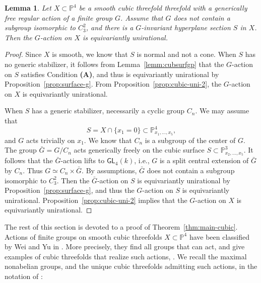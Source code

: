 \documentclass[12pt,reqno]{amsart}
\theoremstyle{plain}
\newtheorem{lemm}[prop]{Lemma}
\theoremstyle{remark}
\theoremstyle{definition}
\numberwithin{equation}{section}
\def\bP{{\mathbb P}}
\def\GL{\mathsf{GL}}
\begin{document}
 \begin{lemm}\label{lemm:invariantunicub}
Let $X\subset \bP^4$ be a smooth cubic threefold threefold with a generically free regular action of a finite group $G$. Assume that $G$ does not contain a subgroup isomorphic to $C_3^2$, and there is a $G$-invariant hyperplane section $S$ in $X$. Then the $G$-action on $X$ is equivariantly unirational.      
 \end{lemm}
\begin{proof}
Since $X$ is smooth, we know that $S$ is normal and not a cone. When $S$ has no generic stabilizer, it follows from Lemma~\ref{lemm:cubsurfgp} that the $G$-action on $S$ satisfies Condition {\bf (A)}, and thus is equivariantly unirational by Proposition~\ref{prop:surface-g}. From Proposition~\ref{prop:cubic-uni-2}, the $G$-action on $X$ is equivariantly unirational.

When $S$ has a generic stabilizer, necessarily a cyclic group $C_n$.  We may assume that 
$$
S=X\cap\{x_1=0\}\subset \bP^4_{x_1,\ldots,x_5},
$$
and $G$ acts trivially on $x_1$. We know that $C_n$ is a subgroup of the center of $G$.  The group $\bar G=G/C_n$ acts generically freely on the cubic surface
$
S\subset \bP^3_{x_2,\ldots,x_5}.
$ It follows that the $\bar G$-action lifts to $\GL_4(k)$, i.e., $G$ is a split central extension of $\bar G$ by $C_n$. Thus $G\simeq C_n\times \bar G$. By assumptions, $\bar G$ does not contain a subgroup isomorphic to $C_3^2$. Then the $\bar G$-action on $S$ is equivariantly unirational by Proposition~\ref{prop:surface-g}, and thus the $G$-action on $S$ is equivariantly unirational. Proposition~\ref{prop:cubic-uni-2} implies that the $G$-action on $X$ is equivariantly unirational.
\end{proof}
The rest of this section is devoted to a proof of Theorem~\ref{thm:main-cubic}. 
Actions of finite groups on smooth cubic threefolds $X\subset \bP^4$ have been classified by Wei and Yu in \cite{wei-yu}. More precisely, they find all groups that can act, and give examples of cubic threefolds that realize such actions, \cite[Theorem 1.1 and Section 3]{wei-yu}. 
We recall the maximal nonabelian groups, and the unique cubic threefolds admitting such actions, in the notation of \cite{wei-yu}:
\end{document}
